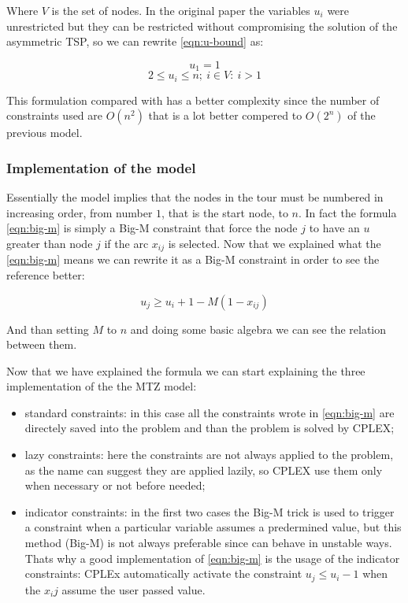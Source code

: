 Where $V$ is the set of nodes. In the original paper the variables $u_i$ were unrestricted but they can be restricted without compromising the solution of the asymmetric TSP, so we can rewrite \ref{eqn:u-bound} as:

\begin{equation}
	u_1=1
\end{equation}
\begin{equation}
	2\le u_i \le n; \: i\in V:\:i>1
\end{equation}

This formulation compared with \cite{dantzig} has a better complexity since the number of constraints used are $O(n^2)$ that is a lot better compered to $O(2^n)$ of the previous model.

\subsubsection{Implementation of the model}
Essentially the model implies that the nodes in the tour must be numbered in increasing order, from number $1$, that is the start node, to $n$. In fact the formula \ref{eqn:big-m} is simply a Big-M constraint that force the node $j$ to have an $u$ greater than node $j$ if the arc $x_{ij}$ is selected. Now that we explained what the \ref{eqn:big-m} means we can rewrite it as a Big-M constraint in order to see the reference better:

\begin{equation}
	u_j\ge u_i+1-M(1-x_{ij})
\end{equation}

And than setting $M$ to $n$ and doing some basic algebra we can see the relation between them.

Now that we have explained the formula we can start explaining the three implementation of the the MTZ model:

\begin{itemize}
	\item standard constraints: in this case all the constraints wrote in \ref{eqn:big-m} are directely saved into the problem and than the problem is solved by CPLEX;
	\item lazy constraints: here the constraints are not always applied to the problem, as the name can suggest they are applied lazily, so CPLEX use them only when necessary or not before needed;
	\item indicator constraints: in the first two cases the Big-M trick is used to trigger a constraint when a particular variable assumes a predermined value, but this method (Big-M) is not always preferable since can behave in unstable ways. Thats why a good implementation of \ref{eqn:big-m} is the usage of the indicator constraints: CPLEx automatically activate the constraint $u_j\le u_i-1$ when the $x_ij$ assume the user passed value.
\end{itemize}


